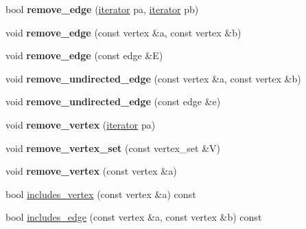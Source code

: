 \begin{DoxyCompactItemize}
bool {\bfseries remove\+\_\+edge} (\mbox{\hyperlink{class_n_graph_1_1t_graph_a6e446a33b74e5c0c39fb6c50a4f07cec}{iterator}} pa, \mbox{\hyperlink{class_n_graph_1_1t_graph_a6e446a33b74e5c0c39fb6c50a4f07cec}{iterator}} pb)
\item 
\mbox{\label{class_n_graph_1_1t_graph_ac1fff890e65f3f1654a79a8574b13378}} 
void {\bfseries remove\+\_\+edge} (const vertex \&a, const vertex \&b)
\item 
\mbox{\label{class_n_graph_1_1t_graph_ac64968018b02ebd689cb9acb96409327}} 
void {\bfseries remove\+\_\+edge} (const edge \&E)
\item 
\mbox{\label{class_n_graph_1_1t_graph_af18958f28aaa6be4aa3ba3e273e5dae3}} 
void {\bfseries remove\+\_\+undirected\+\_\+edge} (const vertex \&a, const vertex \&b)
\item 
\mbox{\label{class_n_graph_1_1t_graph_aa4d5dc7efdb07adb6de626f625701478}} 
void {\bfseries remove\+\_\+undirected\+\_\+edge} (const edge \&e)
\item 
\mbox{\label{class_n_graph_1_1t_graph_ae3ddcc68cfd75c8a8c11a47fc1a449b9}} 
void {\bfseries remove\+\_\+vertex} (\mbox{\hyperlink{class_n_graph_1_1t_graph_a6e446a33b74e5c0c39fb6c50a4f07cec}{iterator}} pa)
\item 
\mbox{\label{class_n_graph_1_1t_graph_adfdabb4a748158e58d1a19ed1ef4fdf1}} 
void {\bfseries remove\+\_\+vertex\+\_\+set} (const vertex\+\_\+set \&V)
\item 
\mbox{\label{class_n_graph_1_1t_graph_a33aa30bb79f01806408465f1250cac0d}} 
void {\bfseries remove\+\_\+vertex} (const vertex \&a)
\item 
bool \mbox{\hyperlink{class_n_graph_1_1t_graph_a260849918a2806a4a9aa1cfad0471e41}{includes\+\_\+vertex}} (const vertex \&a) const
\item 
bool \mbox{\hyperlink{class_n_graph_1_1t_graph_a463b923ee1e3604407837150f17f1a74}{includes\+\_\+edge}} (const vertex \&a, const vertex \&b) const
\item 
\mbox{\label{class_n_graph_1_1t_graph_a8d364cdfbd44f0804a91bdcda683b31b}} 

\end{DoxyCompactItemize}
